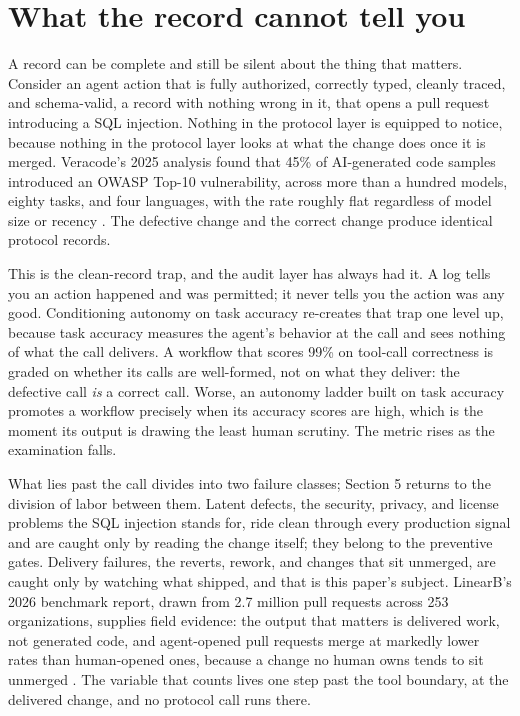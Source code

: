 \section{What the record cannot tell you}

A record can be complete and still be silent about the thing that matters.
Consider an agent action that is fully authorized, correctly typed, cleanly
traced, and schema-valid, a record with nothing wrong in it, that opens a pull
request introducing a SQL injection. Nothing in the protocol layer is equipped to
notice, because nothing in the protocol layer looks at what the change does once
it is merged. Veracode's 2025 analysis found that 45\% of AI-generated code
samples introduced an OWASP Top-10 vulnerability, across more than a hundred
models, eighty tasks, and four languages, with the rate roughly flat regardless
of model size or recency \citep{veracode2025}. The defective change and the
correct change produce identical protocol records.

This is the clean-record trap, and the audit layer has always had it. A log
tells you an action happened and was permitted; it never tells you the action
was any good. Conditioning autonomy on task accuracy re-creates that trap one
level up, because task accuracy measures the agent's behavior at the call and
sees nothing of what the call delivers. A workflow that scores 99\% on tool-call
correctness is graded on whether its calls are well-formed, not on what they
deliver: the defective call \emph{is} a correct call. Worse, an autonomy ladder
built on task accuracy promotes a workflow precisely when its accuracy scores are
high, which is the moment its output is drawing the least human scrutiny. The
metric rises as the examination falls.

What lies past the call divides into two failure classes; Section 5 returns to
the division of labor between them. Latent defects, the security, privacy, and license problems
the SQL injection stands for, ride clean through every production signal and are
caught only by reading the change itself; they belong to the preventive gates.
Delivery failures, the reverts, rework, and changes that sit unmerged, are caught
only by watching what shipped, and that is this paper's subject. LinearB's 2026
benchmark report, drawn from 2.7 million pull requests across 253 organizations,
supplies field evidence: the output that matters is delivered work, not generated
code, and agent-opened pull requests merge at markedly lower rates than
human-opened ones, because a change no human owns tends to sit unmerged
\citep{aibench2026}.
The variable that counts lives one step past the tool boundary, at the delivered
change, and no protocol call runs there.
